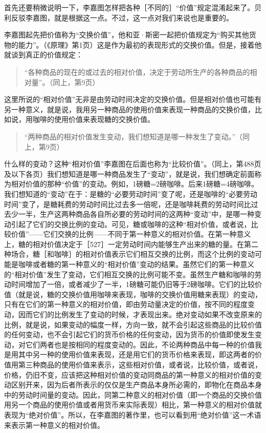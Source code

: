 首先还要稍微说明一下，李嘉图怎样把各种［不同的］“价值”规定混淆起来了。贝利反驳李嘉图，就是根据这一点。不过，这一点对我们来说也是重要的。

李嘉图起先把价值称为“交换价值”，他和亚·斯密一起把价值规定为“购买其他货物的能力”。（《原理》第1页）这是作为最初的表现形式的交换价值。但是，接着他就谈到真正的价值规定：

\begin{quote}{“各种商品的现在的或过去的相对价值，决定于劳动所生产的各种商品的相对量”。（同上，第9页）}\end{quote}

这里所说的“相对价值”无非是由劳动时间决定的交换价值。但是相对价值也可能有另一种意义，就是说，我用另一种商品的使用价值来表现一种商品的交换价值，比如说，用咖啡的使用价值来表现糖的交换价值。

\begin{quote}{“两种商品的相对价值发生变动，我们想知道是哪一种发生了变动。”（同上，第9页）}\end{quote}

什么样的变动？这种“相对价值”李嘉图在后面也称为“比较价值”。（同上，第488页及以下各页）我们想知道是哪一种商品发生了“变动”，就是说，我们想确定前面称为相对价值的那种“价值”的变动。例如，1磅糖=2磅咖啡。后来1磅糖=4磅咖啡。我们想知道的“变动”在于：是糖的“必要劳动时间”变了呢，还是咖啡的“必要劳动时间”变了，是糖耗费的劳动时间比过去多一倍呢，还是咖啡耗费的劳动时间比过去少一半，生产这两种商品各自所必要的劳动时间的这两种“变动”中，是哪一种变动引起了它们的交换比例的变动。可见，糖或咖啡的这种“相对价值，或者说，比较价值”——它们交换的比例——不同于第一种意义的相对价值。在第一种意义上，糖的相对价值决定于［527］一定劳动时间内能够生产出来的糖的量。在第二种场合，糖［和咖啡］的相对价值表示它们相互交换的比例，而这个比例的变动可能是咖啡或者糖的第一种意义的“相对价值”变动的结果。虽然它们的第一种意义的“相对价值”发生了变动，它们相互交换的比例可能不变。虽然生产糖和咖啡的劳动时间增加了一倍，或者减少了一半，1磅糖可能仍旧等于2磅咖啡。它们的比较价值（就是说，糖的交换价值用咖啡来表现，咖啡的交换价值用糖来表现）的变动，只有在它们的第一种意义的相对价值，即由劳动量决定的价值，按不同的程度变动，因而它们的比例发生了变动的时候，才表现出来。绝对变动如果不改变原来的比例，就是说，如果变动的幅度一样，方向一致，就不会引起这些商品的比较价值的任何变动，也不会引起它们的货币价格的任何变动，因为货币的价值即使发生变动，对它们两者也是按相同的程度变动的。因此，不论两种商品中每一种的价值我是用其中另一种的使用价值来表现，还是用它们的货币价格来表现，即这两者的价值用第三种商品的使用价值来表示，这些相对价值，或者说，比较价值，或者说，价格，仍旧不变，应该把这种相对价值的变动同商品的第一种意义的相对价值的变动区别开来，因为后者所表示的仅仅是生产商品本身所必需的，即物化在商品本身中的劳动时间量的变动。因此，同第二种意义的相对价值（即一个商品的交换价值用另一个商品的使用价值或者用货币来实际表现）相比，第一种意义的相对价值就表现为“绝对价值”。所以，在李嘉图的著作里，也可以看到用“绝对价值”这一术语来表示第一种意义的相对价值。

